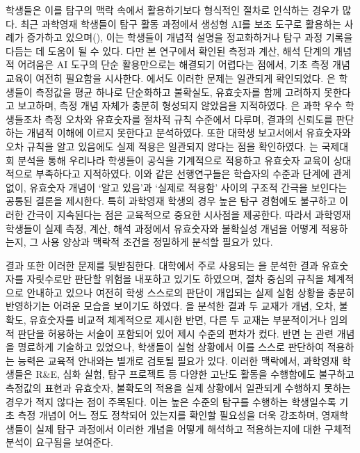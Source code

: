 학생들은 이를 탐구의 맥락 속에서 활용하기보다 형식적인 절차로 인식하는 경우가 많다.
%
최근 과학영재 학생들이 탐구 활동 과정에서 생성형 AI를 보조 도구로 활용하는 사례가
증가하고 있으며(), 이는 학생들이 개념적 설명을 정교화하거나 탐구 과정 기록을 다듬는 데
도움이 될 수 있다. 다만 본 연구에서 확인된 측정과 계산, 해석 단계의 개념적 어려움은 AI 도구의
단순 활용만으로는 해결되기 어렵다는 점에서, 기초 측정 개념 교육이 여전히 필요함을 시사한다.
%
에서도 이러한 문제는 일관되게 확인되었다.
%
은 학생들이 측정값을 평균 하나로 단순화하고 불확실도, 유효숫자를 함께 고려하지
못한다고 보고하며, 측정 개념 자체가 충분히 형성되지 않았음을 지적하였다.
%
은 과학 우수 학생들조차 측정 오차와 유효숫자를 절차적 규칙 수준에서 다루며,
결과의 신뢰도를 판단하는 개념적 이해에 이르지 못한다고 분석하였다.
%
 또한 대학생 보고서에서 유효숫자와 오차 규칙을 알고 있음에도
실제 적용은 일관되지 않다는 점을 확인하였다.
%
는 국제대회 분석을 통해 우리나라 학생들이 공식을 기계적으로 적용하고 유효숫자 교육이
상대적으로 부족하다고 지적하였다.
%
이와 같은 선행연구들은 학습자의 수준과 단계에 관계없이, 유효숫자 개념이 `알고 있음'과
`실제로 적용함' 사이의 구조적 간극을 보인다는 공통된 결론을 제시한다.
특히 과학영재 학생의 경우 높은 탐구 경험에도 불구하고 이러한 간극이 지속된다는 점은
교육적으로 중요한 시사점을 제공한다.
%
따라서 과학영재 학생들이 실제 측정, 계산, 해석 과정에서 유효숫자와 불확실성 개념을
어떻게 적용하는지, 그 사용 양상과 맥락적 조건을 정밀하게 분석할 필요가 있다.

 결과 또한 이러한 문제를 뒷받침한다.
%
대학에서 주로 사용되는 을 분석한 결과
유효숫자를 자릿수로만 판단할 위험을 내포하고 있기도 하였으며,
절차 중심의 규칙을 체계적으로 안내하고 있으나 여전히 학생 스스로의 판단이 개입되는
실제 실험 상황을 충분히 반영하기는 어려운 모습을 보이기도 하였다.
%
을 분석한 결과
두 교재가 개념, 오차, 불확도, 유효숫자를 비교적 체계적으로 제시한 반면,
다른 두 교재는 부분적이거나 임의적 판단을 허용하는 서술이 포함되어 있어 제시 수준의 편차가 컸다.
%
반면 는 관련 개념을 명료하게 기술하고 있었으나,
학생들이 실험 상황에서 이를 스스로 판단하여 적용하는 능력은 교육적 안내와는 별개로 검토될 필요가 있다.
%
이러한 맥락에서, 과학영재 학생들은 R\&E, 심화 실험, 탐구 프로젝트 등 다양한 고난도 활동을
수행함에도 불구하고 측정값의 표현과 유효숫자, 불확도의 적용을 실제 상황에서 일관되게 수행하지 못하는 경우가
적지 않다는 점이 주목된다. 이는 높은 수준의 탐구를 수행하는 학생일수록 기초 측정 개념이 어느 정도
정착되어 있는지를 확인할 필요성을 더욱 강조하며,
영재학생들이 실제 탐구 과정에서 이러한 개념을 어떻게 해석하고 적용하는지에 대한 구체적 분석이 요구됨을 보여준다.